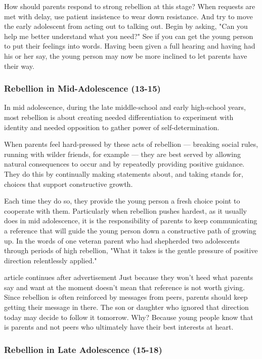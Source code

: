 \documentclass[10pt,a4paper]{article}
\begin{document}
How should parents respond to strong rebellion at this stage? When requests are met with delay, use patient insistence to wear down resistance. And try to move the early adolescent from acting out to talking out. Begin by asking, "Can you help me better understand what you need?" See if you can get the young person to put their feelings into words. Having been given a full hearing and having had his or her say, the young person may now be more inclined to let parents have their way.

\subsubsection{Rebellion in Mid-Adolescence (13-15)}

In mid adolescence, during the late middle-school and early high-school years, most rebellion is about creating needed differentiation to experiment with identity and needed opposition to gather power of self-determination.

When parents feel hard-pressed by these acts of rebellion — breaking social rules, running with wilder friends, for example — they are best served by allowing natural consequences to occur and by repeatedly providing positive guidance. They do this by continually making statements about, and taking stands for, choices that support constructive growth.

Each time they do so, they provide the young person a fresh choice point to cooperate with them. Particularly when rebellion pushes hardest, as it usually does in mid adolescence, it is the responsibility of parents to keep communicating a reference that will guide the young person down a constructive path of growing up. In the words of one veteran parent who had shepherded two adolescents through periods of high rebellion, "What it takes is the gentle pressure of positive direction relentlessly applied."

article continues after advertisement
Just because they won't heed what parents say and want at the moment doesn't mean that reference is not worth giving. Since rebellion is often reinforced by messages from peers, parents should keep getting their message in there. The son or daughter who ignored that direction today may decide to follow it tomorrow. Why? Because young people know that is parents and not peers who ultimately have their best interests at heart.

\subsubsection{Rebellion in Late Adolescence (15-18)}
\end{document}
